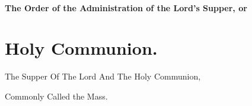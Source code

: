 \subsubsection{The Order of the Administration of the Lord's Supper, or}
\chapter{Holy Communion.}


The Supper Of The Lord And The Holy Communion,

Commonly Called the Mass.







